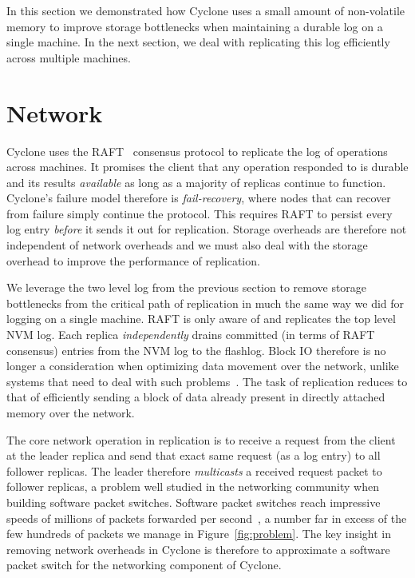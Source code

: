 \documentclass[pageno]{jpaper}
\begin{document}
In this section we demonstrated how Cyclone uses a small amount of non-volatile
memory to improve storage bottlenecks when maintaining a durable log on a single
machine. In the next section, we deal with replicating this log efficiently
across multiple machines.

\section{Network}
\label{sec:network}
Cyclone uses the RAFT~\cite{raft} consensus protocol to replicate the log of
operations across machines. It promises the client that any operation responded
to is durable and its results \emph{available} as long as a majority of replicas
continue to function. Cyclone's failure model therefore is \emph{fail-recovery},
where nodes that can recover from failure simply continue the protocol. This
requires RAFT to persist every log entry \emph{before} it sends it out for
replication. Storage overheads are therefore not independent of network
overheads and we must also deal with the storage overhead to improve the
performance of replication.

We leverage the two level log from the previous section to remove storage
bottlenecks from the critical path of replication in much the same way we did
for logging on a single machine. RAFT is only aware of and replicates the top
level NVM log. Each replica \emph{independently} drains committed (in terms of
RAFT consensus) entries from the NVM log to the flashlog. Block IO therefore is
no longer a consideration when optimizing data movement over the network, unlike
systems that need to deal with such problems~\cite{reflex}. The task of
replication reduces to that of efficiently sending a block of data already
present in directly attached memory over the network. 

The core network operation in replication is to receive a request from the
client at the leader replica and send that exact same request (as a log entry)
to all follower replicas. The leader therefore \emph{multicasts} a received
request packet to follower replicas, a problem well studied in the networking
community when building software packet switches. Software packet switches reach
impressive speeds of millions of packets forwarded per second~\cite{dpdk_perf}, 
a number far in excess of the few hundreds of packets we manage in
Figure~\ref{fig:problem}. The key insight in removing network overheads in
Cyclone is therefore to approximate a software packet switch for the networking
component of Cyclone.
\end{document}
